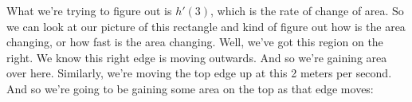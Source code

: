 \documentclass[pdftex, brazil, 12pt, twoside]{article}
\begin{document}
\begin{figure}[H]
  \begin{center}
  \end{center}
\end{figure}

What we're trying to figure out is
$h'(3)$, which is the rate of change of area.
So we can look at our picture of this rectangle
and kind of figure out how is the area changing,
or how fast is the area changing.
Well, we've got this region on the right.
We know this right edge is moving outwards.
And so we're gaining area over here.
Similarly, we're moving the top edge up at this 2 meters
per second.
And so we're going to be gaining some area
on the top as that edge moves:

\begin{figure}[H]
  \begin{center}
  \end{center}
\end{figure}
\end{document}
